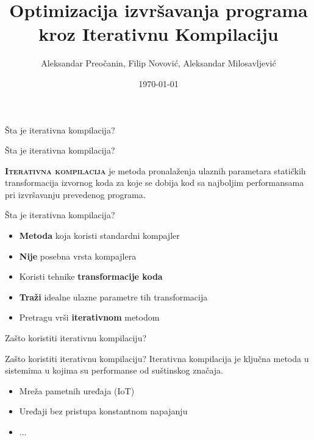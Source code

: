 \documentclass[10pt]{beamer}
\title{ Optimizacija izvršavanja programa kroz Iterativnu Kompilaciju }
\date{\today}
\date{}
\author{Aleksandar Preočanin, Filip Novović, Aleksandar Milosavljević}
\institute{Univerzitet u Beogradu, Matematički fakultet}
\begin{document}
\maketitle

\begin{frame}[standout]
  Šta je iterativna kompilacija?
\end{frame}

\begin{frame}[fragile]{Šta je iterativna kompilacija?}

  {\textbf{\textsc{Iterativna kompilacija}}\xspace} je metoda pronalaženja ulaznih parametara statičkih transformacija
  izvornog koda za koje se dobija kod sa najboljim performansama pri izvršavanju prevedenog programa.
\end{frame}

\begin{frame}[fragile]{Šta je iterativna kompilacija?}
  \begin{itemize}[<+- | alert@+>]
    \item \textbf{Metoda} koja koristi standardni kompajler
    \item \textbf{Nije} posebna vrsta kompajlera
    \item Koristi tehnike \textbf{transformacije koda}
    \item \textbf{Traži} idealne ulazne parametre tih transformacija
    \item Pretragu vrši \textbf{iterativnom} metodom
  \end{itemize}
\end{frame}

\begin{frame}[standout]
  Zašto koristiti iterativnu kompilaciju?
\end{frame}
\begin{frame}[fragile]{Zašto koristiti iterativnu kompilaciju?}
  Iterativna kompilacija je ključna metoda u sistemima u kojima su performanse od suštinskog značaja.
  \begin{itemize}[<+- | alert@+>]
    \item Mreža pametnih uređaja (IoT)
    \item Uređaji bez pristupa konstantnom napajanju
    \item {...}
  \end{itemize}
\end{frame}
\end{document}
